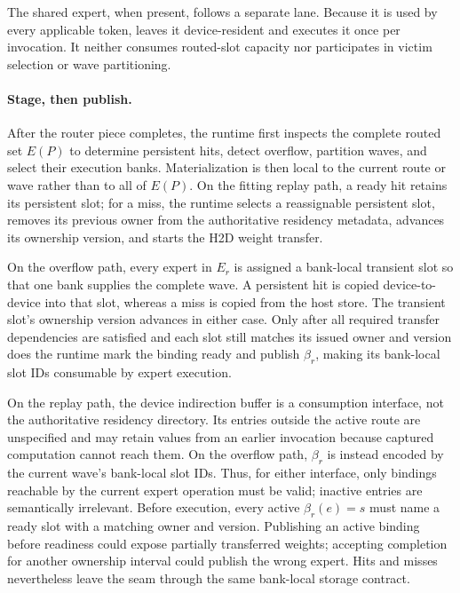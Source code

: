 The shared expert, when present, follows a separate lane. Because it is used by
every applicable token, \system leaves it device-resident and executes it once
per invocation. It neither consumes routed-slot capacity nor participates in
victim selection or wave partitioning.

\paragraph{Stage, then publish.}
After the router piece completes, the runtime first inspects the complete
routed set $E(P)$ to determine persistent hits, detect overflow, partition
waves, and select their execution banks. Materialization is then local to the
current route or wave rather than to all of $E(P)$. On the fitting replay path,
a ready hit retains its persistent slot; for a miss, the runtime selects a
reassignable persistent slot, removes its previous owner from the authoritative
residency metadata, advances its ownership version, and starts the H2D weight
transfer.

On the overflow path, every expert in $E_r$ is assigned a bank-local transient
slot so that one bank supplies the complete wave. A persistent hit is copied
device-to-device into that slot, whereas a miss is copied from the host store.
The transient slot's ownership version advances in either case. Only after all
required transfer dependencies are satisfied and each slot still matches its
issued owner and version does the runtime mark the binding ready and publish
$\beta_r$, making its bank-local slot IDs consumable by expert execution.

On the replay path, the device indirection buffer is a consumption interface,
not the authoritative residency directory. Its entries outside the active
route are unspecified and may retain values from an earlier invocation because
captured computation cannot reach them. On the overflow path, $\beta_r$ is
instead encoded by the current wave's bank-local slot IDs. Thus, for either
interface, only bindings reachable by the current expert operation must be
valid; inactive entries are semantically irrelevant. Before execution, every
active $\beta_r(e)=s$ must name a ready slot with a matching owner and version.
Publishing an active binding before readiness could expose partially
transferred weights; accepting completion for another ownership interval could
publish the wrong expert. Hits and misses nevertheless leave the seam through
the same bank-local storage contract.

